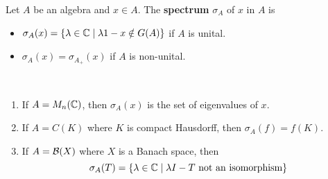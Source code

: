 \documentclass{article}
\begin{document}
\newlec

\begin{dfn*}
  Let $A$ be an algebra and $x \in A$. The {\bf spectrum} $\sigma_A$ of $x$ in $A$ is
  \begin{itemize}
    \item $\sigma_A(x) = \{\lambda \in \mathbb C \mid \lambda 1 - x \notin G(A)\}$ if $A$ is unital.
    \item $\sigma_A(x) = \sigma_{A_+}(x)$ if $A$ is non-unital.
  \end{itemize}
\end{dfn*}

\begin{egs*}~
  \begin{enumerate}
    \item If $A = M_n(\mathbb C)$, then $\sigma_A(x)$ is the set of eigenvalues of $x$.
    \item If $A = C(K)$ where $K$ is compact Hausdorff, then $\sigma_A(f) = f(K)$.
    \item If $A = \mathcal B(X)$ where $X$ is a Banach space, then
    $$\sigma_A(T) = \{\lambda \in \mathbb C \mid \lambda I - T \text{ not an isomorphism}\}$$
  \end{enumerate}
\end{egs*}
\end{document}
